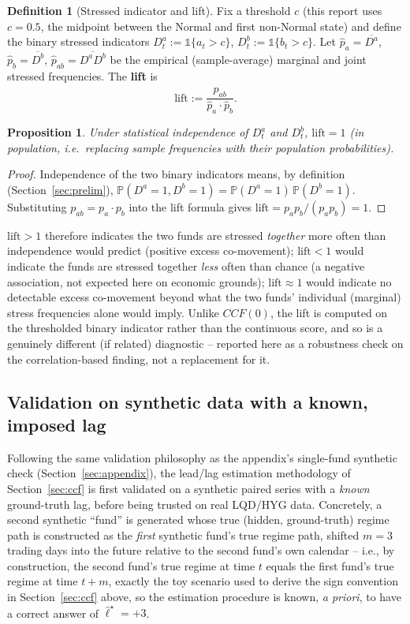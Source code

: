 \documentclass[11pt]{article}
\newtheorem{proposition}[theorem]{Proposition}
\theoremstyle{definition}
\newtheorem{definition}[theorem]{Definition}
\theoremstyle{remark}
\begin{document}
\begin{definition}[Stressed indicator and lift]
Fix a threshold $c$ (this report uses $c=0.5$, the midpoint between the Normal and first non-Normal state) and define the binary stressed indicators $D_t^{a}:=\mathbb{1}\{a_t>c\}$, $D_t^{b}:=\mathbb{1}\{b_t>c\}$. Let $\widehat p_a=\overline{D^a}$, $\widehat p_b=\overline{D^b}$, $\widehat p_{ab}=\overline{D^aD^b}$ be the empirical (sample-average) marginal and joint stressed frequencies. The \textbf{lift} is
\[
\mathrm{lift} := \frac{\widehat p_{ab}}{\widehat p_a\cdot\widehat p_b}.
\]
\end{definition}
\begin{proposition}
Under statistical independence of $D^a_t$ and $D^b_t$, $\mathrm{lift}=1$ (in population, i.e.\ replacing sample frequencies with their population probabilities).
\end{proposition}
\begin{proof}
Independence of the two binary indicators means, by definition (Section~\ref{sec:prelim}), $\mathbb{P}(D^a=1,D^b=1)=\mathbb{P}(D^a=1)\,\mathbb{P}(D^b=1)$. Substituting $p_{ab}=p_a\cdot p_b$ into the lift formula gives $\mathrm{lift}=p_a p_b/(p_a p_b)=1$.
\end{proof}
$\mathrm{lift}>1$ therefore indicates the two funds are stressed \emph{together} more often than independence would predict (positive excess co-movement); $\mathrm{lift}<1$ would indicate the funds are stressed together \emph{less} often than chance (a negative association, not expected here on economic grounds); $\mathrm{lift}\approx1$ would indicate no detectable excess co-movement beyond what the two funds' individual (marginal) stress frequencies alone would imply. Unlike $CCF(0)$, the lift is computed on the thresholded binary indicator rather than the continuous score, and so is a genuinely different (if related) diagnostic -- reported here as a robustness check on the correlation-based finding, not a replacement for it.

\subsection{Validation on synthetic data with a known, imposed lag}
\label{sec:crossetf-demo}

Following the same validation philosophy as the appendix's single-fund synthetic check (Section~\ref{sec:appendix}), the lead/lag estimation methodology of Section~\ref{sec:ccf} is first validated on a synthetic paired series with a \emph{known} ground-truth lag, before being trusted on real LQD/HYG data. Concretely, a second synthetic ``fund'' is generated whose true (hidden, ground-truth) regime path is constructed as the \emph{first} synthetic fund's true regime path, shifted $m=3$ trading days into the future relative to the second fund's own calendar -- i.e., by construction, the second fund's true regime at time $t$ equals the first fund's true regime at time $t+m$, exactly the toy scenario used to derive the sign convention in Section~\ref{sec:ccf} above, so the estimation procedure is known, \emph{a priori}, to have a correct answer of $\widehat\ell^\star=+3$.
\end{document}
